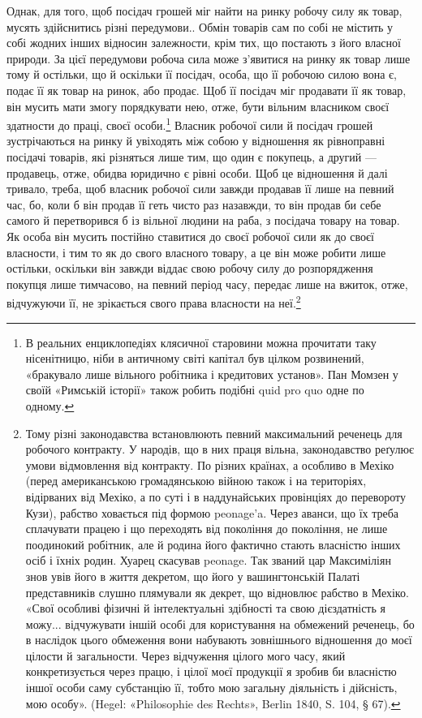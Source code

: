 Однак, для того, щоб посідач грошей міг найти на ринку
робочу силу як товар, мусять здійснитись різні передумови..
Обмін товарів сам по собі не містить у собі жодних інших відносин
залежности, крім тих, що постають з його власної природи.
За цієї передумови робоча сила може з’явитися на ринку як
товар лише тому й остільки, що й оскільки її посідач, особа, що
її робочою силою вона є, подає її як товар на ринок, або продає.
Щоб її посідач міг продавати її як товар, він мусить мати змогу
порядкувати нею, отже, бути вільним власником своєї здатности
до праці, своєї особи.\footnote{
В реальних енциклопедіях клясичної старовини можна прочитати
таку нісенітницю, ніби в античному світі капітал був цілком розвинений,
«бракувало лише вільного робітника і кредитових установ». Пан Момзен
у своїй «Римській історії» також робить подібні quid pro quo одне
по одному.
} Власник робочої сили й посідач грошей
зустрічаються на ринку й увіходять між собою у відношення
як рівноправні посідачі товарів, які різняться лише тим, що
один є покупець, а другий — продавець, отже, обидва юридично
є рівні особи. Щоб це відношення й далі тривало, треба, щоб
власник робочої сили завжди продавав її лише на певний час,
бо, коли б він продав її геть чисто раз назавжди, то він продав би
себе самого й перетворився б із вільної людини на раба, з посідача
товару на товар. Як особа він мусить постійно ставитися до
своєї робочої сили як до своєї власности, і тим то як до свого
власного товару, а це він може робити лише остільки, оскільки
він завжди віддає свою робочу силу до розпорядження покупця
лише тимчасово, на певний період часу, передає лише на вжиток,
отже, відчужуючи її, не зрікається свого права власности
на неї.\footnote{
Тому різні законодавства встановлюють певний максимальний реченець
для робочого контракту. У народів, що в них праця вільна, законодавство
реґулює умови відмовлення від контракту. По різних країнах, а особливо
в Мехіко (перед американською громадянською війною також і на територіях,
відірваних від Мехіко, а по суті і в наддунайських провінціях до
перевороту Кузи), рабство ховається під формою peonage’a. Через аванси,
що їх треба сплачувати працею і що переходять від покоління до покоління,
не лише поодинокий робітник, але й родина його фактично стають
власністю інших осіб і їхніх родин. Хуарец скасував peonage. Так званий
цар Максиміліян знов увів його в життя декретом, що його у вашингтонській
Палаті представників слушно плямували як декрет, що відновлює
рабство в Мехіко. «Свої особливі фізичні й інтелектуальні здібності та
свою дієздатність я можу... відчужувати іншій особі для користування
на обмежений реченець, бо в наслідок цього обмеження вони набувають
зовнішнього відношення до моєї цілости й загальности. Через відчуження
цілого мого часу, який конкретизується через працю, і цілої моєї продукції
я зробив би власністю іншої особи саму субстанцію її, тобто мою загальну
діяльність і дійсність, мою особу». (Hegel: «Philosophie des Rechts», Berlin
1840, S. 104, § 67).
}

